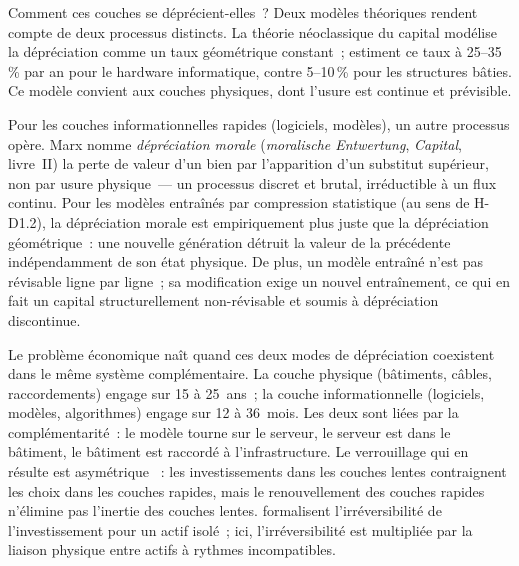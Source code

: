 Comment ces couches se déprécient-elles~? Deux modèles théoriques rendent compte de deux processus distincts. La théorie néoclassique du capital modélise la dépréciation comme un taux géométrique constant~; \textcite{haskel_capitalism_2018} estiment ce taux à 25--35\,\% par an pour le hardware informatique, contre 5--10\,\% pour les structures bâties. Ce modèle convient aux couches physiques, dont l'usure est continue et prévisible.

Pour les couches informationnelles rapides (logiciels, modèles), un autre processus opère. Marx nomme \emph{dépréciation morale} (\emph{moralische Entwertung}, \emph{Capital}, livre~II) la perte de valeur d'un bien par l'apparition d'un substitut supérieur, non par usure physique~--- un processus discret et brutal, irréductible à un flux continu. Pour les modèles entraînés par compression statistique (au sens de H-D1.2), la dépréciation morale est empiriquement plus juste que la dépréciation géométrique~: une nouvelle génération détruit la valeur de la précédente indépendamment de son état physique. De plus, un modèle entraîné n'est pas révisable ligne par ligne~; sa modification exige un nouvel entraînement, ce qui en fait un capital structurellement non-révisable et soumis à dépréciation discontinue.

Le problème économique naît quand ces deux modes de dépréciation coexistent dans le même système complémentaire. La couche physique (bâtiments, câbles, raccordements) engage sur 15 à 25~ans~; la couche informationnelle (logiciels, modèles, algorithmes) engage sur 12 à 36~mois. Les deux sont liées par la complémentarité~: le modèle tourne sur le serveur, le serveur est dans le bâtiment, le bâtiment est raccordé à l'infrastructure. Le verrouillage qui en résulte est asymétrique \parencite{arthur_competing_1989}~: les investissements dans les couches lentes contraignent les choix dans les couches rapides, mais le renouvellement des couches rapides n'élimine pas l'inertie des couches lentes. \textcite{dixit_investment_1994} formalisent l'irréversibilité de l'investissement pour un actif isolé~; ici, l'irréversibilité est multipliée par la liaison physique entre actifs à rythmes incompatibles.

